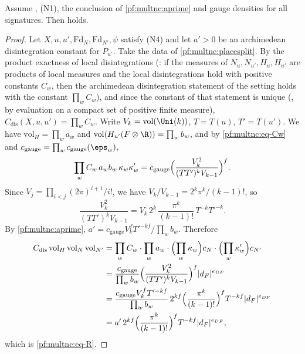 \begin{theorem}\label{pf:multnc:rb-jac}
Assume , (N1), the conclusion of \cref{pf:multnc:aprime} and gauge densities for all signatures. Then
 holds.
\end{theorem}

\begin{proof}
Let $X,u,u',\mathrm{Fd}_N,\mathrm{Fd}_{N'},\psi$ satisfy (N4) and let $a'>0$ be an archimedean disintegration constant for
$P_{u'}$. Take the data of \cref{pf:multnc:placesplit}. By the product exactness of local disintegrations
(: if the measures of $N_u,N_{u'},H_u,H_{u'}$ are
products of local measures and the local disintegrations hold with positive constants $C_w$, then the archimedean
disintegration statement of the setting holds with the constant $\prod_wC_w$), and since the constant of that statement is
unique (, by evaluation on a compact set of positive finite measure),
$C_{\mathrm{dis}}(X,u,u')=\prod_wC_w$. Write $V_k=\mathrm{vol}(\Uni(k))$, $T=T(u)$, $T'=T(u')$. We have
$\mathrm{vol}_H=\prod_wa_w$ and $\mathrm{vol}(H_{u'}(F\otimes\R))=\prod_wb_w$, and by \eqref{pf:multnc:eq-Cw} and
$c_{\mathrm{gauge}}=\prod_wc_{\mathrm{gauge}}(\eps_w)$,
\[
\prod_wC_w\,a_wb_w\,\kappa_w\kappa'_w=c_{\mathrm{gauge}}\Bigl(\frac{V_k^2}{(TT')^kV_{k-1}}\Bigr)^f .
\]
Since $V_j=\prod_{i<j}(2\pi)^{i+1}/i!$, we have $V_k/V_{k-1}=2^k\pi^k/(k-1)!$, so
\[
\frac{V_k^2}{(TT')^kV_{k-1}}=V_k\,2^k\,\frac{\pi^k}{(k-1)!}\,T^{-k}T'^{-k}.
\]
By \cref{pf:multnc:aprime}, $a'=c_{\mathrm{gauge}}V_k^fT'^{-kf}/\prod_wb_w$. Therefore
\begin{align*}
C_{\mathrm{dis}}\,\mathrm{vol}_H\,\mathrm{vol}_N\,\mathrm{vol}_{N'}&=\prod_wC_w\cdot\prod_wa_w\cdot\Bigl(\prod_w\kappa_w\Bigr)c_N
\cdot\Bigl(\prod_w\kappa'_w\Bigr)c_{N'}\\
&=\frac{c_{\mathrm{gauge}}}{\prod_wb_w}\Bigl(\frac{V_k^2}{(TT')^kV_{k-1}}\Bigr)^f|d_F|^{e_{DF}}\\
&=\frac{c_{\mathrm{gauge}}V_k^fT'^{-kf}}{\prod_wb_w}\,2^{kf}\Bigl(\frac{\pi^k}{(k-1)!}\Bigr)^fT^{-kf}|d_F|^{e_{DF}}\\
&=a'\,2^{kf}\Bigl(\frac{\pi^k}{(k-1)!}\Bigr)^fT^{-kf}|d_F|^{e_{DF}},
\end{align*}
which is \eqref{pf:multnc:eq-R}.
\end{proof}

